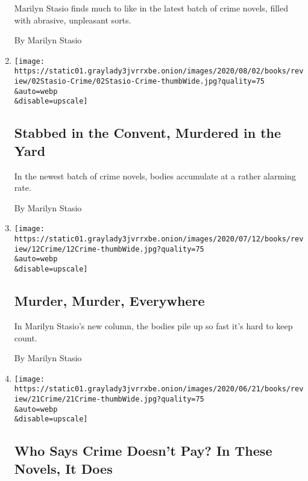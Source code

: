 \begin{enumerate}
  Marilyn Stasio finds much to like in the latest batch of crime novels,
  filled with abrasive, unpleasant sorts.

  By Marilyn Stasio
\item
  \href{/2020/07/31/books/review/crime-fiction-megan-miranda.html}{}

  \texttt{[image: https://static01.graylady3jvrrxbe.onion/images/2020/08/02/books/review/02Stasio-Crime/02Stasio-Crime-thumbWide.jpg?quality=75\\\&auto=webp\\\&disable=upscale]}

  \hypertarget{stabbed-in-the-convent-murdered-in-the-yard}{%
  \subsection{Stabbed in the Convent, Murdered in the
  Yard}\label{stabbed-in-the-convent-murdered-in-the-yard}}

  In the newest batch of crime novels, bodies accumulate at a rather
  alarming rate.

  By Marilyn Stasio
\item
  \href{/2020/07/10/books/review/crime-fiction-jessica-barry-dont-turn-around.html}{}

  \texttt{[image: https://static01.graylady3jvrrxbe.onion/images/2020/07/12/books/review/12Crime/12Crime-thumbWide.jpg?quality=75\\\&auto=webp\\\&disable=upscale]}

  \hypertarget{murder-murder-everywhere}{%
  \subsection{Murder, Murder,
  Everywhere}\label{murder-murder-everywhere}}

  In Marilyn Stasio's new column, the bodies pile up so fast it's hard
  to keep count.

  By Marilyn Stasio
\item
  \href{/2020/06/18/books/review/crime-fiction-james-lee-burke-jeffery-deaver.html}{}

  \texttt{[image: https://static01.graylady3jvrrxbe.onion/images/2020/06/21/books/review/21Crime/21Crime-thumbWide.jpg?quality=75\\\&auto=webp\\\&disable=upscale]}

  \hypertarget{who-says-crime-doesnt-pay-in-these-novels-it-does}{%
  \subsection{Who Says Crime Doesn't Pay? In These Novels, It
  Does}\label{who-says-crime-doesnt-pay-in-these-novels-it-does}}


\end{enumerate}
